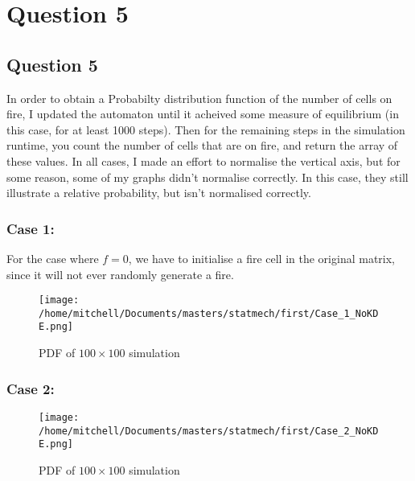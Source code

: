 \documentclass[11pt,a4paper]{article}
\begin{document}
\label{sec:question4:subsec:parta}

\medskip
\section{Question 5}
\label{sec:question5}


\subsection{Question 5}
\label{sec:question5:subsec:parta}
In order to obtain a Probabilty distribution function of the number of cells on fire, I updated the automaton until it acheived some measure of equilibrium (in this case, for at least 1000 steps). Then for the remaining steps in the simulation runtime, you count the number of cells that are on fire, and return the array of these values. In all cases, I made an effort to normalise the vertical axis, but for some reason, some of my graphs didn't normalise correctly. In this case, they still illustrate a relative probability, but isn't normalised correctly. 
\subsubsection{Case 1:}
For the case where $f=0$, we have to initialise a fire cell in the original matrix, since it will not ever randomly generate a fire. 
\begin{figure}[H]
\centering
\texttt{[image: /home/mitchell/Documents/masters/statmech/first/Case\_1\_NoKDE.png]}
\caption{PDF of $100 \times 100$ simulation}
\end{figure}

\subsubsection{Case 2:}

\begin{figure}[H]
\centering
\texttt{[image: /home/mitchell/Documents/masters/statmech/first/Case\_2\_NoKDE.png]}\caption{PDF of $100 \times 100$ simulation}
\end{figure}
\end{document}

